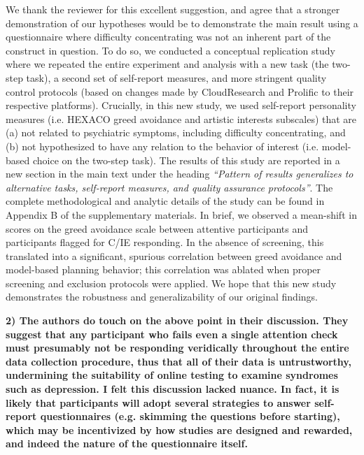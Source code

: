\documentclass[a4paper,notitlepage,12pt]{article}
\begin{document}
We thank the reviewer for this excellent suggestion, and agree that a stronger demonstration of our hypotheses would be to demonstrate the main result using a questionnaire where difficulty concentrating was not an inherent part of the construct in question. To do so, we conducted a conceptual replication study where we repeated the entire experiment and analysis with a new task (the two-step task), a second set of self-report measures, and more stringent quality control protocols (based on changes made by CloudResearch and Prolific to their respective platforms). Crucially, in this new study, we used self-report personality measures (i.e. HEXACO greed avoidance and artistic interests subscales) that are (a) not related to psychiatric symptoms, including difficulty concentrating, and (b) not hypothesized to have any relation to the behavior of interest (i.e. model-based choice on the two-step task). The results of this study are reported in a new section in the main text under the heading \textit{``Pattern of results generalizes to alternative tasks, self-report measures, and quality assurance protocols''}. The complete methodological and analytic details of the study can be found in Appendix B of the supplementary materials. In brief, we observed a mean-shift in scores on the greed avoidance scale between attentive participants and participants flagged for C/IE responding. In the absence of screening, this translated into a significant, spurious correlation between greed avoidance and model-based planning behavior; this correlation was ablated when proper screening and exclusion protocols were applied. We hope that this new study demonstrates the robustness and generalizability of our original findings. 

\textbf{2) The authors do touch on the above point in their discussion. They suggest that any participant who fails even a single attention check must presumably not be responding veridically throughout the entire data collection procedure, thus that all of their data is untrustworthy, undermining the suitability of online testing to examine syndromes such as depression. I felt this discussion lacked nuance. In fact, it is likely that participants will adopt several strategies to answer self-report questionnaires (e.g. skimming the questions before starting), which may be incentivized by how studies are designed and rewarded, and indeed the nature of the questionnaire itself.}
\end{document}
